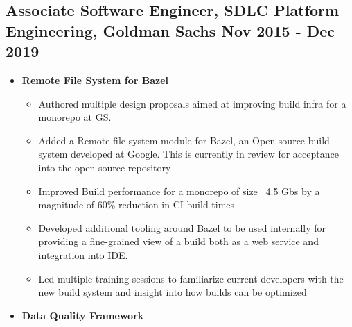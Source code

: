 \begin{itemize}[label=\textperiodcentered,labelindent=0pt,itemindent=1em,leftmargin=0.3cm,itemsep=0pt]
\subsection*{\small{Associate Software Engineer, SDLC Platform Engineering,  Goldman Sachs \hfill Nov 2015 - Dec 2019}}
\begin{itemize}[label=\textperiodcentered,labelindent=0pt,itemindent=1em,leftmargin=0.3cm,itemsep=0pt]
    \begin{itemize}[label=\textperiodcentered,itemindent=1em,leftmargin=0.3cm,itemsep=0pt]
        \item \textbf{Remote File System for Bazel}
            \begin{itemize}
                \item {Authored multiple design proposals aimed at improving build infra for a monorepo at GS.}
                \item {Added a Remote file system module for Bazel, an Open source build system developed at Google. This is currently in review for acceptance into the open source repository}
                \item Improved Build performance for a monorepo of size ~4.5 Gbs by a magnitude of 60\% reduction in CI build times
                \item Developed additional tooling around Bazel to be used internally for providing a fine-grained view of a build both as a web service and integration into IDE. 
                \item Led multiple training sessions to familiarize current developers with the new build system and insight into how builds can be optimized
            \end{itemize}
            
        \item \textbf{Data Quality Framework}
    \end{itemize}
    

\end{itemize}
\end{itemize}
